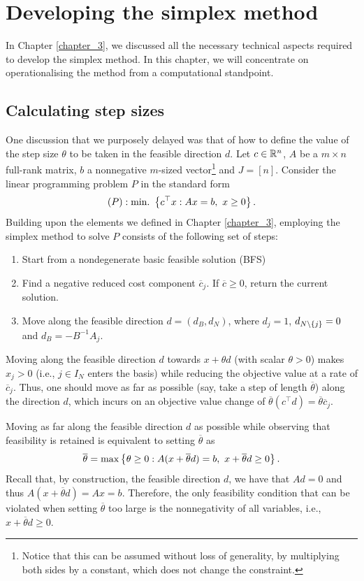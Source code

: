 \section{Developing the simplex method}

In Chapter \ref{chapter_3}, we discussed all the necessary technical aspects required to develop the simplex method. In this chapter, we will concentrate on operationalising the method from a computational standpoint.

\subsection{Calculating step sizes}

One discussion that we purposely delayed was that of how to define the value of the step size $\theta$ to be taken in the feasible direction $d$. Let $c \in \mathbb{R}^n$, $A$ be a $m \times n$ full-rank matrix, $b$ a nonnegative $m$-sized vector\footnote{Notice that this can be assumed without loss of generality, by multiplying both sides by a constant, which does not change the constraint.} and $J = [n]$. Consider the linear programming problem $P$ in the standard form 
%
	\begin{equation*}
		(P) : \mathop{\text{min.~}}\left\{ c^\top x : Ax = b, ~x \geq 0 \right \}.
	\end{equation*}
%
Building upon the elements we defined in Chapter \ref{chapter_3}, employing the simplex method to solve $P$ consists of the following set of steps:
%
\begin{enumerate}
	\item Start from a nondegenerate basic feasible solution (BFS)
	\item Find a negative reduced cost component $\overline{c}_j$. If $\overline{c} \geq 0$, return the current solution. 
	\item Move along the feasible direction $d = (d_B, d_N)$, where $d_j = 1$, $d_{N \setminus \left\{ j \right \}} = 0$ and $d_B = -B^{-1}A_j$.
\end{enumerate}
%
Moving along the feasible direction $d$ towards $x + \theta d$ (with scalar $\theta > 0$) makes $x_j >0$ (i.e., $j \in I_N$ enters the basis) while reducing the objective value at a rate of $\overline{c}_j$. Thus, one should move as far as possible (say, take a step of length $\overline{\theta}$) along the direction $d$, which incurs on an objective value change of $\overline{\theta} (c^\top d) = \overline{\theta} \overline{c}_j$.

Moving as far along the feasible direction $d$ as possible while observing that feasibility is retained is equivalent to setting $\overline{\theta}$ as 	
%
\begin{equation*}
	\overline{\theta} = \max\left\{ \theta \geq 0 : A(x + \overline{\theta} d) = b, \ x + \overline{\theta}d \geq 0 \right \}.	
\end{equation*}
%
Recall that, by construction, the feasible direction $d$, we have that $Ad = 0$ and thus $A(x + \overline{\theta} d) = Ax = b$. Therefore, the only feasibility condition that can be violated when setting $\overline{\theta}$ too large is the nonnegativity of all variables, i.e., $x + \overline{\theta}d \geq 0$. 

